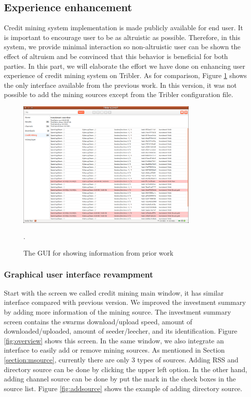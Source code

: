\subsection{Experience enhancement}
Credit mining system implementation is made publicly available for end user. It is important to encourage user to be as altruistic as possible. Therefore, in this system, we provide minimal interaction so non-altruistic user can be shown the effect of altruism and be convinced that this behavior is beneficial for both parties. In this part, we will elaborate the effort we have done on enhancing user experience of credit mining system on Tribler. As for comparison, Figure \ref{fig:oldcm} shows the only interface available from the previous work. In this version, it was not possible to add the mining sources except from the Tribler configuration file. 

\begin{figure}[h]
	\centering
	\includegraphics[width=0.8\textwidth]{pics/old_cm.png}
	\caption{The GUI for showing information from prior work \cite{2015:creditmining:capota}}.
	\label{fig:oldcm}
\end{figure}

\subsubsection{Graphical user interface revampment}

Start with the screen we called credit mining main window, it has similar interface compared with previous version. We improved the investment summary by adding more information of the mining source. The investment summary screen contains the swarms download/upload speed, amount of downloaded/uploaded, amount of seeder/leecher, and its identification. Figure \ref{fig:overview} shows this screen. In the same window, we also integrate an interface to easily add or remove mining sources. As mentioned in Section \ref{section:msource}, currently there are only 3 types of sources. Adding RSS and directory source can be done by clicking the upper left option. In the other hand, adding channel source can be done by put the mark in the check boxes in the source list. Figure \ref{fig:addsource} shows the example of adding directory source.

